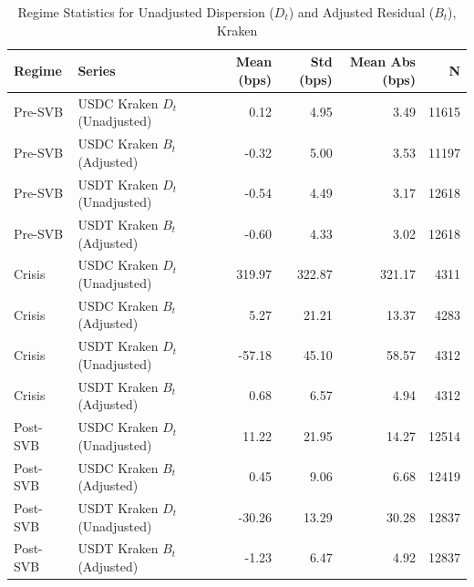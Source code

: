 \begin{table}[H]
\caption{Regime Statistics for Unadjusted Dispersion ($D_t$) and Adjusted Residual ($B_t$), Kraken}
\label{tab:dispersion_vs_adjusted}
\begin{tabular}{llrrrr}
\toprule
Regime & Series & Mean (bps) & Std (bps) & Mean Abs (bps) & N \\
\midrule
Pre-SVB & USDC Kraken $D_t$ (Unadjusted) & 0.12 & 4.95 & 3.49 & 11615 \\
Pre-SVB & USDC Kraken $B_t$ (Adjusted) & -0.32 & 5.00 & 3.53 & 11197 \\
Pre-SVB & USDT Kraken $D_t$ (Unadjusted) & -0.54 & 4.49 & 3.17 & 12618 \\
Pre-SVB & USDT Kraken $B_t$ (Adjusted) & -0.60 & 4.33 & 3.02 & 12618 \\
Crisis & USDC Kraken $D_t$ (Unadjusted) & 319.97 & 322.87 & 321.17 & 4311 \\
Crisis & USDC Kraken $B_t$ (Adjusted) & 5.27 & 21.21 & 13.37 & 4283 \\
Crisis & USDT Kraken $D_t$ (Unadjusted) & -57.18 & 45.10 & 58.57 & 4312 \\
Crisis & USDT Kraken $B_t$ (Adjusted) & 0.68 & 6.57 & 4.94 & 4312 \\
Post-SVB & USDC Kraken $D_t$ (Unadjusted) & 11.22 & 21.95 & 14.27 & 12514 \\
Post-SVB & USDC Kraken $B_t$ (Adjusted) & 0.45 & 9.06 & 6.68 & 12419 \\
Post-SVB & USDT Kraken $D_t$ (Unadjusted) & -30.26 & 13.29 & 30.28 & 12837 \\
Post-SVB & USDT Kraken $B_t$ (Adjusted) & -1.23 & 6.47 & 4.92 & 12837 \\
\bottomrule
\end{tabular}
\end{table}
